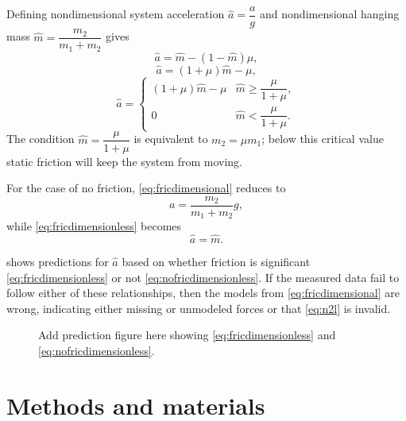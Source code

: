 \documentclass[reprint,amsmath,amssymb,aps,twoside]{revtex4-2}
\begin{document}
Defining nondimensional system acceleration $\hat{a} = \dfrac{a}{g}$ and nondimensional hanging mass $\hat{m} = \dfrac{m_2}{m_1+m_2}$ gives
\begin{equation}
\hat{a} = \hat{m} - (1-\hat{m}) \mu,
\end{equation}
\begin{equation}
\hat{a} = (1+\mu) \hat{m} - \mu,
\end{equation}
\begin{equation}
\hat{a} = 
\begin{cases}
(1+\mu) \hat{m} - \mu & \hat{m} \geq \dfrac{\mu}{1+\mu}, \\
0 & \hat{m} < \dfrac{\mu}{1+\mu}.
\end{cases}
\label{eq:fricdimensionless}
\end{equation}
The condition $\hat{m}=\dfrac{\mu}{1+\mu}$ is equivalent to $m_2=\mu m_1$; below this critical value static friction will keep the system from moving. 

For the case of no friction, \cref{eq:fricdimensional} reduces to
\begin{equation}
a = \dfrac{m_2}{m_1+m_2} g,
\label{eq:nofricdimensional}
\end{equation}
while \cref{eq:fricdimensionless} becomes
\begin{equation}
\hat{a} = \hat{m}.
\label{eq:nofricdimensionless}
\end{equation}

 shows predictions for $\hat{a}$ based on whether friction is significant \cref{eq:fricdimensionless} or not \cref{eq:nofricdimensionless}. If the measured data fail to follow either of these relationships, then the models from \cref{eq:fricdimensional} are wrong, indicating either missing or unmodeled forces or that \cref{eq:n2l} is invalid. 
\begin{figure}
\caption{\label{fig:prediction} Add prediction figure here showing \cref{eq:fricdimensionless} and \cref{eq:nofricdimensionless}.}
\end{figure}

\section{Methods and materials}
\cite{R-2024,ggplot2-2024}
\end{document}
